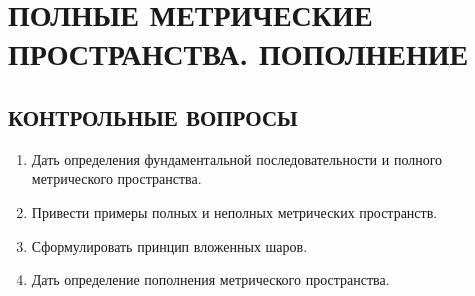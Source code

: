 \documentclass[12pt,a4paper]{article}
\begin{document}
\section{ПОЛНЫЕ МЕТРИЧЕСКИЕ ПРОСТРАНСТВА. ПОПОЛНЕНИЕ}

\subsection*{КОНТРОЛЬНЫЕ ВОПРОСЫ}
\begin{enumerate}
\item Дать определения фундаментальной последовательности и полного метрического пространства.
\item Привести примеры полных и неполных метрических пространств.
\item Сформулировать принцип вложенных шаров.
\item Дать определение пополнения метрического пространства.
\end{enumerate}
\end{document}
